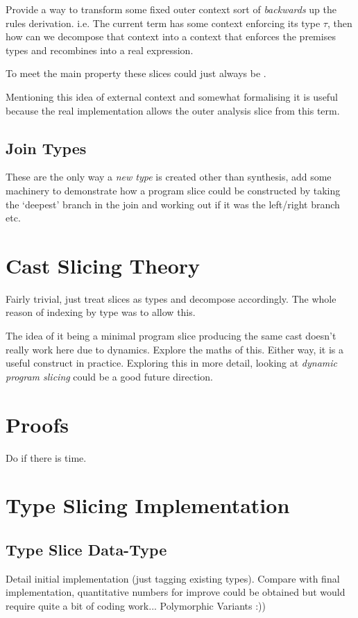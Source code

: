 Provide a way to transform some fixed outer context sort of \textit{backwards} up the rules derivation. i.e. The current term has some context enforcing its type $\tau$, then how can we decompose that context into a context that enforces the premises types and recombines into a real expression.


To meet the main property these slices could just always be \dyn.

Mentioning this idea of external context and somewhat formalising it is useful because the real implementation allows the outer analysis slice from this term. 


\subsection{Join Types}
These are the only way a \textit{new type} is created other than synthesis, add some machinery to demonstrate how a program slice could be constructed by taking the `deepest' branch in the join and working out if it was the left/right branch etc.

\section{Cast Slicing Theory}\label{sec:CastSlicingTheory}

Fairly trivial, just treat slices as types and decompose accordingly. The whole reason of indexing by type was to allow this.

The idea of it being a minimal program slice producing the same cast doesn't really work here due to dynamics. Explore the maths of this. Either way, it is a useful construct in practice. Exploring this in more detail, looking at \textit{dynamic program slicing} could be a good future direction.

\section{Proofs}\label{sec:Proofs}
Do if there is time.

\section{Type Slicing Implementation}\label{sec:TypeSlicingImplementation}
\subsection{Type Slice Data-Type}\label{sec:TypeSliceDataType}
Detail initial implementation (just tagging existing types). Compare with final implementation, quantitative numbers for improve could be obtained but would require quite a bit of coding work... Polymorphic Variants :))

